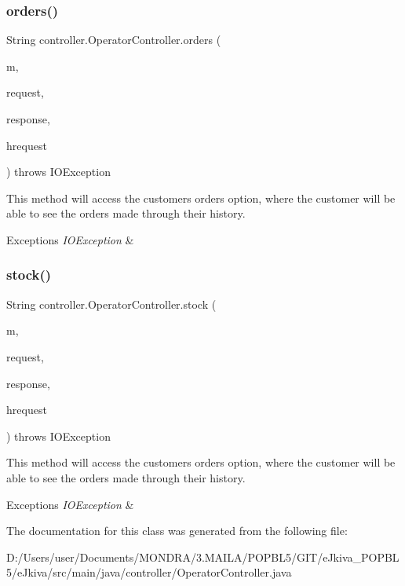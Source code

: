 \subsubsection{\texorpdfstring{orders()}{orders()}}
{\footnotesize\ttfamily String controller.\+Operator\+Controller.\+orders (\begin{DoxyParamCaption}\item[{Model}]{m,  }\item[{Web\+Request}]{request,  }\item[{Http\+Servlet\+Response}]{response,  }\item[{Http\+Servlet\+Request}]{hrequest }\end{DoxyParamCaption}) throws I\+O\+Exception\hspace{0.3cm}{\ttfamily [inline]}}

This method will access the customer\textquotesingle{}s \textquotesingle{}orders\textquotesingle{} option, where the customer will be able to see the orders made through their history. 
\begin{DoxyExceptions}{Exceptions}
{\em I\+O\+Exception} & \\
\hline
\end{DoxyExceptions}
\mbox{\label{classcontroller_1_1_operator_controller_a20f145b080521609c4513dc5544612a2}} 
\subsubsection{\texorpdfstring{stock()}{stock()}}
{\footnotesize\ttfamily String controller.\+Operator\+Controller.\+stock (\begin{DoxyParamCaption}\item[{Model}]{m,  }\item[{Web\+Request}]{request,  }\item[{Http\+Servlet\+Response}]{response,  }\item[{Http\+Servlet\+Request}]{hrequest }\end{DoxyParamCaption}) throws I\+O\+Exception\hspace{0.3cm}{\ttfamily [inline]}}

This method will access the customer\textquotesingle{}s \textquotesingle{}orders\textquotesingle{} option, where the customer will be able to see the orders made through their history. 
\begin{DoxyExceptions}{Exceptions}
{\em I\+O\+Exception} & \\
\hline
\end{DoxyExceptions}


The documentation for this class was generated from the following file\+:\begin{DoxyCompactItemize}
\item 
D\+:/\+Users/user/\+Documents/\+M\+O\+N\+D\+R\+A/3.\+M\+A\+I\+L\+A/\+P\+O\+P\+B\+L5/\+G\+I\+T/e\+Jkiva\+\_\+\+P\+O\+P\+B\+L5/e\+Jkiva/src/main/java/controller/Operator\+Controller.\+java\end{DoxyCompactItemize}
